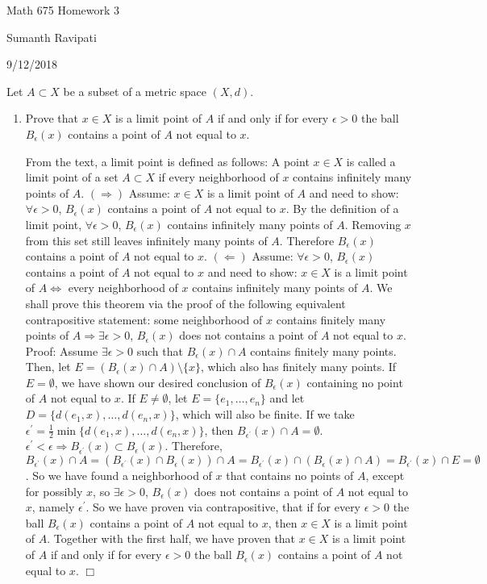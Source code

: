 \documentclass[12pt,letterpaper,reqno]{amsart}
\begin{document}
\thispagestyle{empty}
\centerline{\Large Math 675 Homework 3}
\centerline{Sumanth Ravipati}
\centerline{9/12/2018}

Let $A\subset X$ be a subset of a metric space $(X,d)$. 
\begin{enumerate}[1.]
\item Prove that $x\in X$ is a limit point of $A$ if and only if for every $\epsilon>0$ the ball $B_\epsilon(x)$ contains a point of $A$ not equal to $x$.
\begin{flushleft}
From the text, a limit point is defined as follows:  A point $x \in X$ is called a limit point of a set $A \subset X$ if every neighborhood of $x$ contains infinitely many points of $A$. \newline $(\Rightarrow)$ Assume: $x \in X$ is a limit point of $A$ and need to show: $\forall \epsilon > 0$, $B_\epsilon(x)$ contains a point of $A$ not equal to $x$. By the definition of a limit point, $\forall \epsilon > 0$, $B_\epsilon(x)$ contains infinitely many points of $A$. Removing $x$ from this set still leaves infinitely many points of $A$. Therefore $B_\epsilon(x)$ contains a point of $A$ not equal to $x$.
\newline $(\Leftarrow)$ Assume: $\forall \epsilon > 0$, $B_\epsilon(x)$ contains a point of $A$ not equal to $x$ and need to show: $x \in X$ is a limit point of $A \Leftrightarrow$ every neighborhood of $x$ contains infinitely many points of $A$. We shall prove this theorem via the proof of the following equivalent contrapositive statement: some neighborhood of $x$ contains finitely many points of $A \Rightarrow \exists \epsilon > 0$, $B_\epsilon(x)$ does not contains a point of $A$ not equal to $x$. Proof: Assume $\exists \epsilon > 0$ such that $B_\epsilon(x) \cap A$ contains finitely many points. Then, let $E = (B_\epsilon(x) \cap A)\setminus \{x\}$, which also has finitely many points. If $E = \emptyset$, we have shown our desired conclusion of $B_\epsilon(x)$ containing no point of $A$ not equal to $x$. If $E \not= \emptyset$, let $E = \{e_1, \ldots, e_n\}$ and let $D = \{d(e_1,x), \ldots, d(e_n, x)\}$, which will also be finite. If we take $\epsilon^\prime = \frac{1}{2} \min\{d(e_1,x), \ldots, d(e_n, x)\}$, then $B_{\epsilon^\prime}(x) \cap A = \emptyset$. $\epsilon^\prime < \epsilon \Rightarrow B_{\epsilon^\prime}(x) \subset B_\epsilon(x)$. Therefore, $B_{\epsilon^\prime}(x) \cap A = (B_{\epsilon^\prime}(x) \cap B_\epsilon(x))\cap A = B_{\epsilon^\prime}(x) \cap (B_\epsilon(x)\cap A) = B_{\epsilon^\prime}(x) \cap E = \emptyset$. So we have found a neighborhood of $x$ that contains no points of $A$, except for possibly $x$, so $\exists \epsilon > 0$, $B_\epsilon(x)$ does not contains a point of $A$ not equal to $x$, namely $\epsilon^\prime$. So we have proven via contrapositive, that if for every $\epsilon>0$ the ball $B_\epsilon(x)$ contains a point of $A$ not equal to $x$, then $x\in X$ is a limit point of $A$. Together with the first half, we have proven that $x\in X$ is a limit point of $A$ if and only if for every $\epsilon>0$ the ball $B_\epsilon(x)$ contains a point of $A$ not equal to $x$. $\Box$
\end{flushleft}


\end{enumerate}
\end{document}
